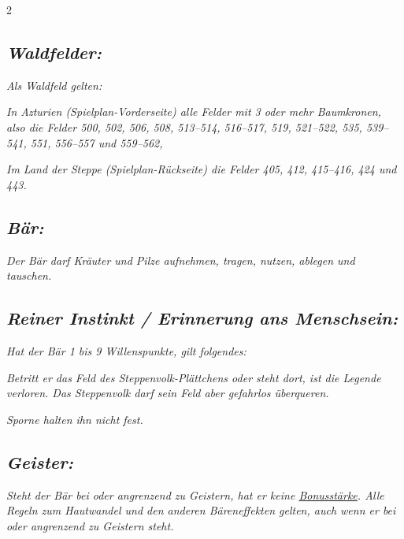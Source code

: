 \documentclass[10pt, a4paper, oneside]{book}
\newcommand{\fan}[1]{\textit{#1}}
\begin{document}
\begin{multicols*}{2}
\begin{bgcolor}
\subsection{\fan{Waldfelder:}}

\fan{Als Waldfeld gelten:}

\bullet{} \fan{In Azturien (Spielplan-Vorderseite) alle Felder mit 3 oder mehr Baumkronen, also die Felder 500, 502, 506, 508, 513–514, 516–517, 519, 521–522, 535, 539–541, 551, 556–557 und 559–562,}

\bullet{} \fan{Im Land der Steppe (Spielplan-Rückseite) die Felder 405, 412, 415–416, 424 und 443.}


\subsection{\fan{Bär:}}

\fan{Der Bär darf Kräuter und Pilze aufnehmen, tragen, nutzen, ablegen und tauschen.}



\subsection{\fan{Reiner Instinkt / Erinnerung ans Menschsein:}}

\fan{Hat der Bär 1 bis 9 Willenspunkte, gilt folgendes:}

\bullet{} \fan{Betritt er das Feld des Steppenvolk-Plättchens oder steht dort, ist die Legende verloren. Das Steppenvolk darf sein Feld aber gefahrlos überqueren.}

\bullet{} \fan{Sporne halten ihn nicht fest.}


\subsection{\fan{Geister:}}

\fan{Steht der Bär bei oder angrenzend zu Geistern, hat er keine \hyperref[Bonusstärke]{Bonusstärke}. Alle Regeln zum Hautwandel und den anderen Bäreneffekten gelten, auch wenn er bei oder angrenzend zu Geistern steht.}

\end{bgcolor}







\end{multicols*}
\end{document}
